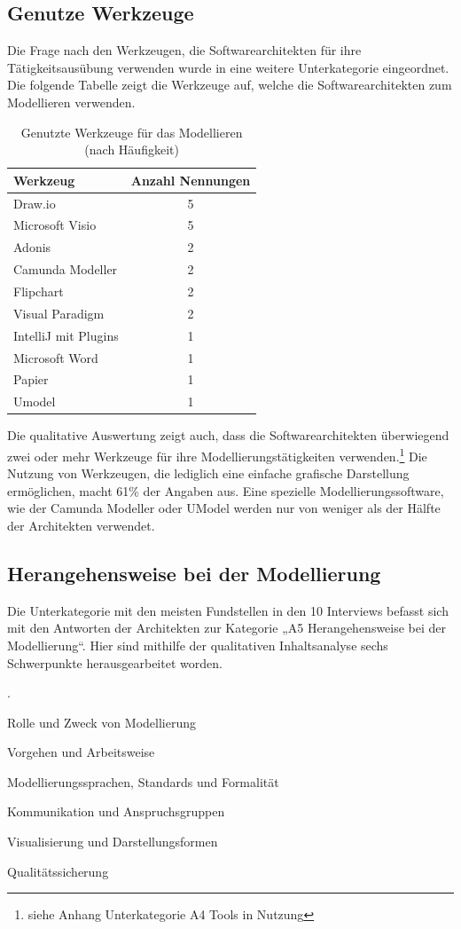\subsection{Genutze Werkzeuge}

Die Frage nach den Werkzeugen, die Softwarearchitekten für ihre Tätigkeitsausübung verwenden wurde in eine weitere Unterkategorie eingeordnet. Die folgende Tabelle zeigt die Werkzeuge auf, welche die Softwarearchitekten zum Modellieren verwenden.

\begin{table}[h]
\centering
\caption{Genutzte Werkzeuge für das Modellieren (nach Häufigkeit)}
\label{tab:modellierungswerkzeuge}
\begin{tabular}{l c}
\toprule
\textbf{Werkzeug} & \textbf{Anzahl Nennungen} \\
\midrule
Draw.io & 5 \\
Microsoft Visio & 5 \\
Adonis & 2 \\
Camunda Modeller & 2 \\
Flipchart & 2 \\
Visual Paradigm & 2 \\
IntelliJ mit Plugins & 1 \\
Microsoft Word & 1 \\
Papier & 1 \\
Umodel & 1 \\
\bottomrule
\end{tabular}
\end{table}

Die qualitative Auswertung zeigt auch, dass die Softwarearchitekten überwiegend zwei oder mehr Werkzeuge für ihre Modellierungstätigkeiten verwenden.\footnote{siehe Anhang Unterkategorie A4 Tools in Nutzung} Die Nutzung von Werkzeugen, die lediglich eine einfache grafische Darstellung ermöglichen, macht 61\% der Angaben aus. Eine spezielle Modellierungssoftware, wie der Camunda Modeller oder UModel werden nur von weniger als der Hälfte der Architekten verwendet.


\subsection{Herangehensweise bei der Modellierung}

Die Unterkategorie mit den meisten Fundstellen in den 10 Interviews befasst sich mit den Antworten der Architekten zur Kategorie „A5 Herangehensweise bei der Modellierung“. Hier sind mithilfe der qualitativen Inhaltsanalyse sechs Schwerpunkte herausgearbeitet worden.
\begin{list}{.}{\setlength{\leftmargin}{2cm}}
    \item Rolle und Zweck von Modellierung
    \item Vorgehen und Arbeitsweise
    \item Modellierungssprachen, Standards und Formalität
    \item Kommunikation und Anspruchsgruppen
    \item Visualisierung und Darstellungsformen
    \item Qualitätssicherung
\end{list}

